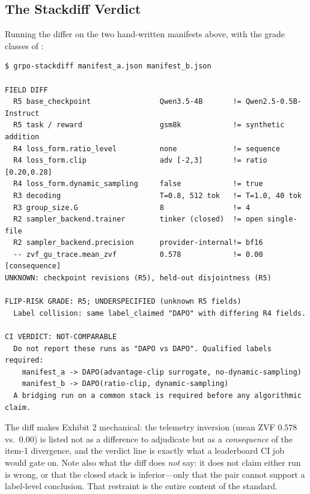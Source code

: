 \subsection{The Stackdiff Verdict}
\label{app:p5-verdict}
Running the differ on the two hand-written manifests above, with the grade
classes of :
\begin{lstlisting}[basicstyle=\ttfamily\footnotesize, frame=single,
                   breaklines=true, columns=fullflexible]
$ grpo-stackdiff manifest_a.json manifest_b.json

FIELD DIFF
  R5 base_checkpoint                Qwen3.5-4B       != Qwen2.5-0.5B-Instruct
  R5 task / reward                  gsm8k            != synthetic addition
  R4 loss_form.ratio_level          none             != sequence
  R4 loss_form.clip                 adv [-2,3]       != ratio [0.20,0.28]
  R4 loss_form.dynamic_sampling     false            != true
  R3 decoding                       T=0.8, 512 tok   != T=1.0, 40 tok
  R3 group_size.G                   8                != 4
  R2 sampler_backend.trainer        tinker (closed)  != open single-file
  R2 sampler_backend.precision      provider-internal!= bf16
  -- zvf_gu_trace.mean_zvf          0.578            != 0.00   [consequence]
UNKNOWN: checkpoint revisions (R5), held-out disjointness (R5)

FLIP-RISK GRADE: R5; UNDERSPECIFIED (unknown R5 fields)
  Label collision: same label_claimed "DAPO" with differing R4 fields.

CI VERDICT: NOT-COMPARABLE
  Do not report these runs as "DAPO vs DAPO". Qualified labels required:
    manifest_a -> DAPO(advantage-clip surrogate, no-dynamic-sampling)
    manifest_b -> DAPO(ratio-clip, dynamic-sampling)
  A bridging run on a common stack is required before any algorithmic claim.
\end{lstlisting}
The diff makes Exhibit 2 mechanical: the telemetry inversion (mean ZVF $0.578$
vs.\ $0.00$) is listed not as a difference to adjudicate but as a
\emph{consequence} of the item-1 divergence, and the verdict line is exactly
what a leaderboard CI job would gate on. Note also what the diff does
\emph{not} say: it does not claim either run is wrong, or that the closed
stack is inferior---only that the pair cannot support a label-level
conclusion. That restraint is the entire content of the standard.

